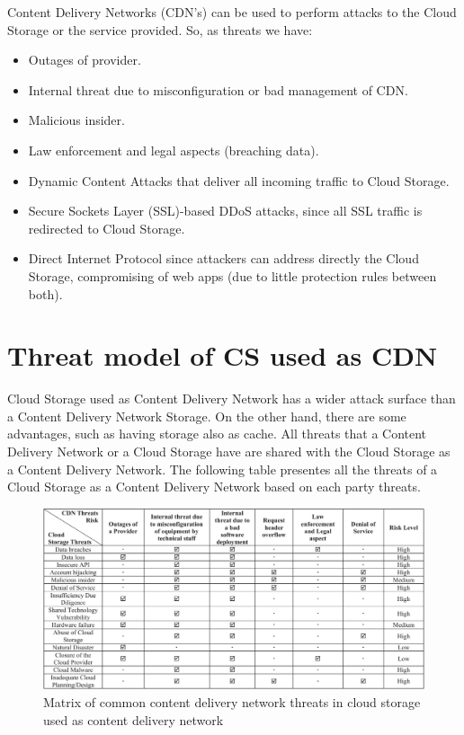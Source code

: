 \documentclass[14pt,oneside]{extreport}
\newcommand*\fpar{\hspace{1ex}}
\begin{document}
\fpar Content Delivery Networks (CDN's) can be used to perform attacks to the Cloud Storage or the service provided. So, as threats we have:
\begin{itemize}[noitemsep]
  \item Outages of provider.
  \item Internal threat due to misconfiguration or bad management of CDN.
  \item Malicious insider.
  \item Law enforcement and legal aspects (breaching data).
  \item Dynamic Content Attacks that deliver all incoming traffic to Cloud Storage.
  \item Secure Sockets Layer (SSL)-based DDoS attacks, since all SSL traffic is redirected to Cloud Storage.
  \item Direct Internet Protocol since attackers can address directly the Cloud Storage, compromising of web apps (due to little protection rules between both).
\end{itemize}

\section{Threat model of CS used as CDN}

\fpar Cloud Storage used as Content Delivery Network has a wider attack surface than a Content Delivery Network Storage. On the other hand, there are some advantages, such as having storage also as cache. All threats that a Content Delivery Network or a Cloud Storage have are shared with the Cloud Storage as a Content Delivery Network. The following table presentes all the threats of a Cloud Storage as a Content Delivery Network based on each party threats.

\begin{figure}[H]
  \centering
  \includegraphics[width=\textwidth]{paper3/3_table.png}
  \caption{Matrix of common content delivery network threats in cloud storage used as content delivery network}
  \label{fig:table}
\end{figure}
\end{document}
